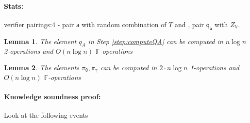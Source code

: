 \documentclass[11pt]{article} %
\newcommand{\F}{\ensuremath{\mathbb F}\xspace}
\newtheorem{lemma}{Lemma}[section]
\newcommand{\bigspace}{\ensuremath{\mathbb{V}}\xspace}
\newcommand{\witsize}{\ensuremath{n}\xspace}
\newcommand{\witruntime}{\ensuremath{\witsize\log\witsize}\xspace}
\newcommand{\tabsize}{\ensuremath{N}\xspace}
\renewcommand{\a}{\ensuremath{\mathsf{a}}\xspace}
\newcommand{\qa}{\ensuremath{\mathsf{q_a}}\xspace}
\newcommand{\gamproof}{\ensuremath{\mathsf{\pi_\gamma}}\xspace}
\newcommand{\zerproof}{\ensuremath{\mathsf{\pi_0}}\xspace}
\begin{document}
\paragraph{Stats:}

verifier pairings:4 - pair \a with random combination of $T$ and \enc2{x^{d-\tabsize}}, pair \qa with $Z_\bigspace$.

\begin{lemma}\label{lem:computeQA}
The element $q_A$ in Step \ref{step:computeQA} can be computed in  \witruntime \G2-operations and $O(\witruntime)$ \F-operations
\end{lemma}
\begin{lemma}\label{lem:computeKZGproofs}
The elements $\zerproof,\gamproof$ can be computed in  $2\cdot\witruntime$ \G1-operations and $O(\witruntime)$ \F-operations
\end{lemma}

\paragraph{Knowledge soundness proof:}

Look at the following events 


\end{document}

